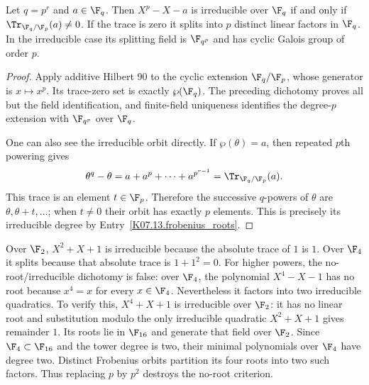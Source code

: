 \begin{theorem}
Let $q=p^r$ and $a\in\F_q$. Then $X^p-X-a$ is irreducible over $\F_q$ if and only if $\Tr_{\F_q/\F_p}(a)\ne0$. If the trace is zero it splits into $p$ distinct linear factors in $\F_q$. In the irreducible case its splitting field is $\F_{q^p}$ and has cyclic Galois group of order $p$.
\end{theorem}
\begin{proof}
Apply additive Hilbert 90 to the cyclic extension $\F_q/\F_p$, whose generator is $x\mapsto x^p$. Its trace-zero set is exactly $\wp(\F_q)$. The preceding dichotomy proves all but the field identification, and finite-field uniqueness identifies the degree-$p$ extension with $\F_{q^p}$ over $\F_q$.

One can also see the irreducible orbit directly. If $\wp(\theta)=a$, then repeated $p$th powering gives
\[\theta^q-\theta=a+a^p+\cdots+a^{p^{r-1}}=\Tr_{\F_q/\F_p}(a).\]
This trace is an element $t\in\F_p$. Therefore the successive $q$-powers of $\theta$ are $\theta,\theta+t,\ldots$; when $t\ne0$ their orbit has exactly $p$ elements. This is precisely its irreducible degree by Entry~\ref{K07.13.frobenius_roots}.
\end{proof}
\begin{example}
Over $\F_2$, $X^2+X+1$ is irreducible because the absolute trace of $1$ is $1$. Over $\F_4$ it splits because that absolute trace is $1+1^2=0$. For higher powers, the no-root/irreducible dichotomy is false: over $\F_4$, the polynomial $X^4-X-1$ has no root because $x^4=x$ for every $x\in\F_4$. Nevertheless it factors into two irreducible quadratics. To verify this, $X^4+X+1$ is irreducible over $\F_2$: it has no linear root and substitution modulo the only irreducible quadratic $X^2+X+1$ gives remainder $1$. Its roots lie in $\F_{16}$ and generate that field over $\F_2$. Since $\F_4\subset\F_{16}$ and the tower degree is two, their minimal polynomials over $\F_4$ have degree two. Distinct Frobenius orbits partition its four roots into two such factors. Thus replacing $p$ by $p^2$ destroys the no-root criterion.
\end{example}

